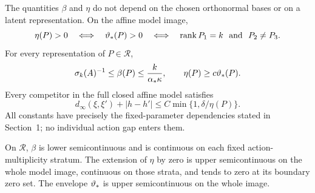 \begin{theorem}\label{thm:residue}
The quantities $\beta$ and $\eta$ do not depend on the chosen
orthonormal bases or on a latent representation. On the affine model
image,
\begin{equation}\label{eq:zero-set}
 \eta(P)>0\quad\Longleftrightarrow\quad
 \vartheta_*(P)>0\quad\Longleftrightarrow\quad
 \operatorname{rank} P_1=k\ \hbox{ and }\ P_2\ne P_3.
\end{equation}
For every representation of $P\in\mathcal R$,
\begin{equation}\label{eq:beta-bounds}
 \sigma_k(A)^{-1}\le\beta(P)\le\frac{k}{\alpha_*\kappa},
 \qquad \eta(P)\ge c\vartheta_*(P).
\end{equation}
Every competitor in the full closed affine model satisfies
\begin{equation}\label{eq:eta-inverse}
 d_\infty(\xi,\xi')+|h-h'|
     \le C\min\{1,\delta/\eta(P)\}.
\end{equation}
All constants have precisely the fixed-parameter dependencies stated
in Section~1; no individual action gap enters them.

On $\mathcal R$, $\beta$ is lower semicontinuous and is continuous on
each fixed action-multiplicity stratum. The extension of $\eta$ by
zero is upper semicontinuous on the whole model image, continuous on
those strata, and tends to zero at its boundary zero set.
The envelope $\vartheta_*$ is upper semicontinuous on the whole image.
\end{theorem}
